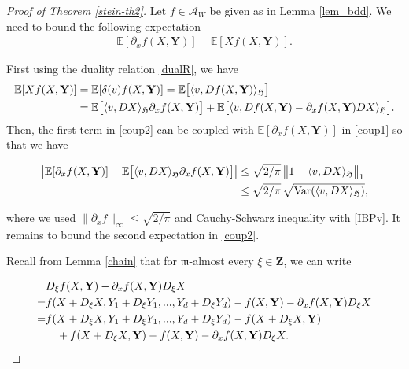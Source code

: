 \documentclass[letterpaper, 11pt,  reqno]{amsart}
\newcommand{\noi}{\noindent}
\newcommand{\bE}{\mathbb{E}}
\newcommand{\E}{\mathbb{E}}
\newcommand{\dl}{\delta}
\newcommand{\jb}[1]
{\langle #1 \rangle}
\newcommand{\Var}{\textup{Var}}
\newcommand{\fm}{\mathfrak{m}}
\newcommand{\fH}{\mathfrak{H}}
\numberwithin{equation}{section}
\numberwithin{theorem}{section}
\begin{document}
\begin{proof}[Proof of Theorem \ref{stein-th2}] 


Let $f\in\mathcal{A}_W$ be given as in Lemma \ref{lem_bdd}. We need to bound 
the following expectation 
\begin{align} \label{coup1}
 \bE[ \partial_x f (X,\mathbf{Y})]   -\bE[X f(X,\mathbf{Y})]. 
\end{align}

 
First using the duality relation \eqref{dualR},
we have
 \begin{align} 
 \E[X f(X,\mathbf{Y})] 
 & = \E[ \dl(v) f(X,\mathbf{Y})]  = \E\big[ \jb{ v, D f(X,\mathbf{Y}) }_\fH \big]  \notag  \\
 &=  \E\big[ \jb{ v, DX}_\fH \partial_x f(X, \mathbf{Y}) \big]
  +  \E\big[ \jb{ v,  Df(X, \mathbf{Y}) -\partial_x f(X, \mathbf{Y})   DX}_\fH \big].  \label{coup2}
 \end{align}
 Then, the first term in \eqref{coup2} can be coupled with $ \bE[ \partial_x f (X,\mathbf{Y})]$
 in \eqref{coup1} so that we have 
 
 \noi
 \begin{align} \label{coup1a}
  \begin{aligned}
 \big|  \bE[ \partial_x f (X,\mathbf{Y})]  -  \E\big[ \jb{ v, DX}_\fH \partial_x f(X, \mathbf{Y}) \big] \big|
& \leq \sqrt{2/\pi}\, \big\| 1 -  \jb{ v, DX}_\fH  \big\|_1 \\
&\leq  \sqrt{2/\pi}\,  \sqrt{ \Var( \jb{ v, DX}_\fH  )},
 \end{aligned}
 \end{align}
 
 \noi
 where we used $\| \partial_x f\|_\infty \leq  \sqrt{2/\pi}$
 and Cauchy-Schwarz inequality with  \eqref{IBPv}.
 It remains to bound the second expectation in \eqref{coup2}.
 
 Recall from   Lemma \ref{chain} that for $\fm$-almost every $\xi\in\mathbf{Z}$,
 we can write 
 
 \noi
 \begin{align}
& D_\xi f(X, \mathbf{Y}) -\partial_x f(X, \mathbf{Y})   D_\xi X \notag \\
 =&  f(X + D_\xi X, Y_1 + D_\xi Y_1, ... , Y_d + D_\xi Y_d) -   f(X, \mathbf{Y}) -
 \partial_x f(X, \mathbf{Y})   D_\xi X  \notag \\
 = & f(X + D_\xi X, Y_1 + D_\xi Y_1, ... , Y_d + D_\xi Y_d) - f( X + D_\xi X, \mathbf{Y} )   \label{coup3a} \\
 &\quad  +  f( X + D_\xi X, \mathbf{Y} )
 -   f(X, \mathbf{Y}) -
 \partial_x f(X, \mathbf{Y})   D_\xi X.   \label{coup3b}
 \end{align}
 

\end{proof}
\end{document}
